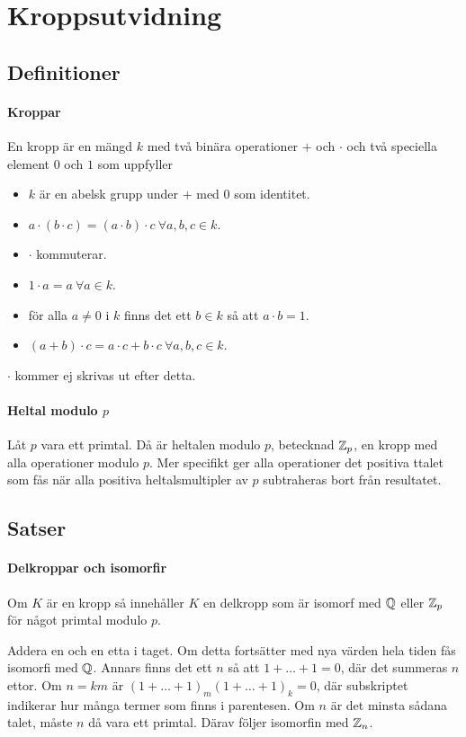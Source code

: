 \section{Kroppsutvidning}

\subsection{Definitioner}

\paragraph{Kroppar}
En kropp är en mängd $k$ med två binära operationer $+$ och $\cdot$ och två speciella element $0$ och $1$ som uppfyller
\begin{itemize}
	\item $k$ är en abelsk grupp under $+$ med $0$ som identitet.
	\item $a\cdot(b\cdot c) = (a\cdot b)\cdot c\ \forall a, b, c\in k$.
	\item $\cdot$ kommuterar.
	\item $1\cdot a = a\ \forall a\in k$.
	\item för alla $a\neq 0$ i $k$ finns det ett $b\in k$ så att $a\cdot b = 1$.
	\item $(a + b)\cdot c = a\cdot c + b\cdot c\ \forall a, b, c\in k$.
\end{itemize}
$\cdot$ kommer ej skrivas ut efter detta.

\paragraph{Heltal modulo $p$}
Låt $p$ vara ett primtal. Då är heltalen modulo $p$, betecknad $\mathbb{Z}_{p}$, en kropp med alla operationer modulo $p$. Mer specifikt ger alla operationer det positiva ttalet som fås när alla positiva heltalsmultipler av $p$ subtraheras bort från resultatet.

\subsection{Satser}

\paragraph{Delkroppar och isomorfir}
Om $K$ är en kropp så innehåller $K$ en delkropp som är isomorf med $\mathbb{Q}$ eller $\mathbb{Z}_{p}$ för något primtal modulo $p$.

\proof
Addera en och en etta i taget. Om detta fortsätter med nya värden hela tiden fås isomorfi med $\mathbb{Q}$. Annars finns det ett $n$ så att $1 + \dots + 1 = 0$, där det summeras $n$ ettor. Om $n = km$ är $(1 + \dots + 1)_{m}(1 + \dots + 1)_{k} = 0$, där subskriptet indikerar hur många termer som finns i parentesen. Om $n$ är det minsta sådana talet, måste $n$ då vara ett primtal. Därav följer isomorfin med $\mathbb{Z}_{n}$.

